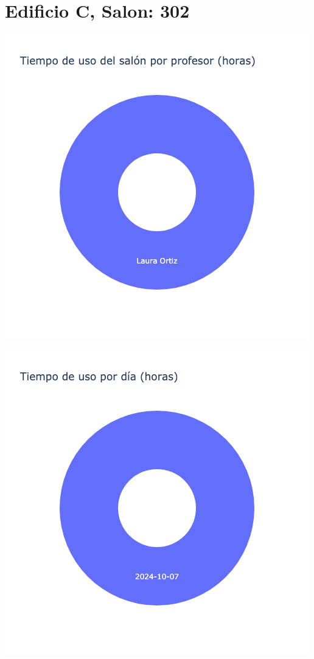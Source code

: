 \documentclass{article}
\begin{document}
    \section{Edificio C, Salon: 302}
    \noindent
    \begin{minipage}{0.48\textwidth}
        \centering
        \includegraphics[width=\textwidth]{../img/pie/UP302-90Dias-03-12-2024.png}
    \end{minipage}
    \hfill
    \begin{minipage}{0.48\textwidth}
        \centering
        \includegraphics[width=\textwidth]{../img/pie/UD302-90Dias-03-12-2024.png}
    \end{minipage}
    
\end{document}
